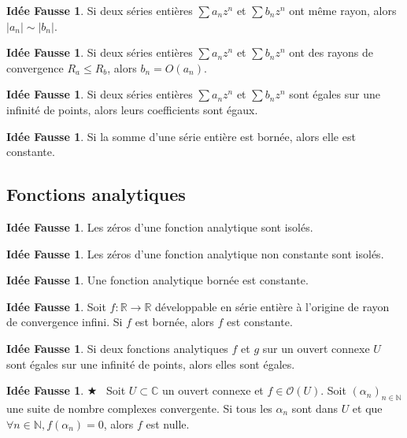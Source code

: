 \documentclass[11pt,a4paper]{article}
\newcommand{\N}{\mathbb{N}}
\newcommand{\R}{\mathbb{R}}
\newcommand{\C}{\mathbb{C}}
\theoremstyle{definition}
\newtheorem{ideeFausse}[theoreme]{Idée Fausse}
\theoremstyle{plain}
\newcommand{\important}{$\bigstar$~}
\begin{document}
\begin{ideeFausse}
Si deux séries entières $\sum a_nz^n$ et $\sum b_nz^n$ ont même rayon, alors $|a_n| \sim |b_n|$.
\end{ideeFausse}

\begin{ideeFausse}
Si deux séries entières $\sum a_nz^n$ et $\sum b_nz^n$ ont  des rayons de convergence $R_a\leq R_b$, alors $b_n = O(a_n)$.
\end{ideeFausse}

\begin{ideeFausse}
Si deux séries entières $\sum a_nz^n$ et $\sum b_nz^n$ sont égales sur une infinité de points, alors leurs coefficients sont égaux.
\end{ideeFausse}

\begin{ideeFausse}
Si la somme d'une série entière est bornée, alors elle est constante.
\end{ideeFausse}


\subsection{Fonctions analytiques}

\begin{ideeFausse}
Les zéros d'une fonction analytique sont isolés.
\end{ideeFausse}

\begin{ideeFausse}
Les zéros d'une fonction analytique non constante sont isolés.
\end{ideeFausse}

\begin{ideeFausse}
Une fonction analytique bornée est constante.
\end{ideeFausse}



\begin{ideeFausse}
Soit $f : \R\to \R$ développable en série entière à l'origine de rayon de convergence infini. Si $f$ est bornée, alors $f$ est constante.
\end{ideeFausse}

\begin{ideeFausse}
Si deux fonctions analytiques $f$ et $g$ sur un ouvert connexe $U$ sont égales sur une infinité de points, alors elles sont égales.
\end{ideeFausse}

\begin{ideeFausse}\important
Soit $U\subset \C$ un ouvert connexe et $f\in \mathcal O(U)$.
Soit $(\alpha_n)_{n\in\N}$ une suite de nombre complexes convergente.
Si tous les $\alpha_n$ sont dans $U$ et que $\forall n\in \N, f(\alpha_n)=0$, alors $f$ est nulle.
\end{ideeFausse}
\end{document}
